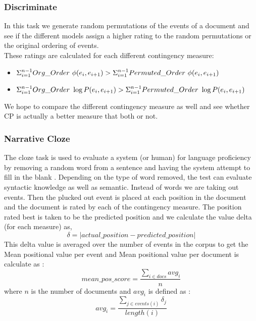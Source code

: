 \documentclass[12pt]{article}
\begin{document}
\subsubsection{Discriminate}
In this task we generate random permutations of the events of a document and see if the different models assign a higher rating to the random permutations or the original ordering of events. \\
These ratings are calculated for each different contingency measure:
\begin{itemize}
	\item $\Sigma_{i=1}^{n-1}Org\_Order \ \phi(e_i,e_{i+1})   > \\ \Sigma_{i=1}^{n-1} Permuted\_Order \ \phi(e_i,e_{i+1})$
	\item $\Sigma_{i=1}^{n-1}Org\_Order \ \log P(e_i,e_{i+1})   > \\ \Sigma_{i=1}^{n-1} Permuted\_Order \ \log P(e_i,e_{i+1})$
	
\end{itemize}
We hope to compare the different contingency measure as well and see whether CP is actually a better measure that both or not.

\subsubsection{Narrative Cloze}
The cloze task\cite{cloze_proc} is used to evaluate a system (or human) for language proficiency by removing a random word from a sentence and having the system attempt to fill in the blank . Depending on the type of word removed, the test can evaluate syntactic knowledge as well as semantic\cite{nec}. Instead of words we are taking out events. Then the plucked out event is placed at each position in the document and the document is rated by each of the contingency measure. The position rated best is taken to be the predicted position and we calculate the value delta (for each measure) as,
\begin{equation}
\delta = |actual\_position - predicted\_position|
\end{equation}
This delta value is averaged over the number of events in the corpus to get the Mean positional value per event and Mean positional value per document is calculate as :
\begin{equation}
	mean\_pos\_score =\frac{\sum_{i \in docs} avg_i}{n}
\end{equation}
where $n$ is the number of documents and $avg_i$ is defined as :
\begin{equation}
	avg_i  = \frac{\sum_{j \in events(i)} \delta_j}{length(i)}
\end{equation}
\end{document}
